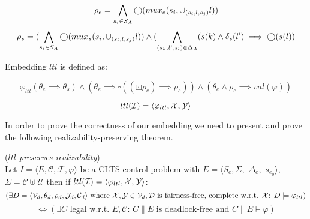 \[ {\rho_e} = \bigwedge_{s_i \in S_A} \bigcirc(mux_e(s_i,\cup_{(s_i,l,s_j)}l))\]
\[ {\rho_s} = (\bigwedge_{s_i \in S_A} \bigcirc(mux_s(s_i,\cup_{(s_i,l,s_j)}l)) \wedge (\bigwedge_{(s_k,l',s_l) \in \Delta_A} (s(k) \wedge \delta_s(l') \implies \bigcirc(s(l))\]

Embedding $ltl$ is defined as:

\[ \varphi_{ltl}(\theta_e \implies \theta_s) \wedge (\theta_e \implies \square((\boxdot \rho_e) \implies \rho_s)) \wedge (\theta_e \wedge \rho_e \implies val(\varphi)) \]

\[ltl(\mathcal{I}) = \langle \varphi_{ltl}, {\mathcal{X}}, {\mathcal{Y}}\rangle \]

%
In order to prove the correctness of our embedding we need to present and prove the following realizability-preserving theorem.

\begin{theorem}(\emph{$ltl$ preserves realizability})\label{theorem:gs_preserves_realizability}\\
	Let $I = \langle E, \mathcal{C}, \mathcal{F}, \varphi \rangle$ be a CLTS control problem with $E = \langle S_e,\Sigma,$ $\Delta_e,$ $s_{e_0}\rangle$, $\Sigma = \mathcal{C}\uplus \mathcal{U}$ then if $ltl(\mathcal{I}) = \langle \varphi_{ltl}, {\mathcal{X}}, {\mathcal{Y}}\rangle$:
	\small
	\[(\exists D= \langle \mathcal{V}_d, \theta_d, \rho_d, \mathcal{J}_d, \mathcal{C}_d\rangle  \text{ where }  {\mathcal{X}}, {\mathcal{Y}} \in \mathcal{V}_d, \mathcal{D} \text{ is fairness-free, complete w.r.t. } {\mathcal{X}} \text{: } D \models \varphi_{ltl})\] \[ \iff (\exists C \text{ legal w.r.t. } E,\mathcal{C} \text{: } C \parallel E \text{ is deadlock-free and } C \parallel E \models \varphi)  \]
	\normalsize
\end{theorem}